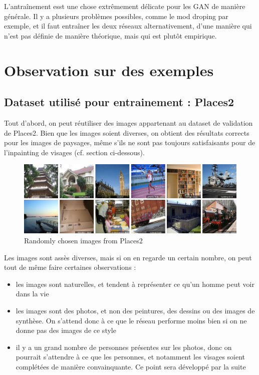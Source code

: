 \documentclass[12pt]{article}
\begin{document}
L'antraînement esst une chose extrêmement délicate pour les GAN de manière générale. Il y a plusieurs problèmes possibles, comme le mod droping par exemple, et il faut entraîner les deux réseaux alternativement, d'une manière qui n'est pas définie de manière théorique, mais qui est plutôt empirique.

\section{Observation sur des exemples}

\subsection{Dataset utilisé pour entrainement : Places2}

Tout d'abord, on peut réutiliser des images appartenant au dataset de validation de Places2. Bien que les images soient diverses, on obtient des résultats corrects pour les images de paysages, même s'ils ne sont pas toujours satisfaisants pour de l'inpainting de visages (cf. section ci-dessous).

\begin{figure}[H]
    \includegraphics[width=1.0\textwidth]{Images/Places2.png}
    \caption{Randomly chosen images from Places2}
\end{figure}

Les images sont assès diverses, mais si on en regarde un certain nombre, on peut tout de même faire certaines observations : 
\begin{itemize}
\item les images sont naturelles, et tendent à représenter ce qu'un homme peut voir dans la vie
\item les images sont des photos, et non des peintures, des dessins ou des images de synthèse. On s'attend donc à ce que le réseau performe moins bien si on ne donne pas des images de ce style
\item il y a un grand nombre de personnes présentes sur les photos, donc on pourrait s'attendre à ce que les personnes, et notamment les visages soient complétées de manière convainquante.  Ce point sera développé par la suite
\end{itemize}
\end{document}
